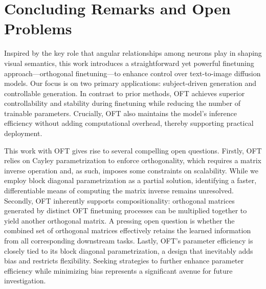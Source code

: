 \section{Concluding Remarks and Open Problems}

Inspired by the key role that angular relationships among neurons play in shaping visual semantics, this work introduces a straightforward yet powerful finetuning approach—orthogonal finetuning—to enhance control over text-to-image diffusion models. Our focus is on two primary applications: subject-driven generation and controllable generation. In contrast to prior methods, OFT achieves superior controllability and stability during finetuning while reducing the number of trainable parameters. Crucially, OFT also maintains the model’s inference efficiency without adding computational overhead, thereby supporting practical deployment.

This work with OFT gives rise to several compelling open questions. Firstly, OFT relies on Cayley parametrization to enforce orthogonality, which requires a matrix inverse operation and, as such, imposes some constraints on scalability. While we employ block diagonal parametrization as a partial solution, identifying a faster, differentiable means of computing the matrix inverse remains unresolved. Secondly, OFT inherently supports compositionality: orthogonal matrices generated by distinct OFT finetuning processes can be multiplied together to yield another orthogonal matrix. A pressing open question is whether the combined set of orthogonal matrices effectively retains the learned information from all corresponding downstream tasks. Lastly, OFT’s parameter efficiency is closely tied to its block diagonal parametrization, a design that inevitably adds bias and restricts flexibility. Seeking strategies to further enhance parameter efficiency while minimizing bias represents a significant avenue for future investigation.

